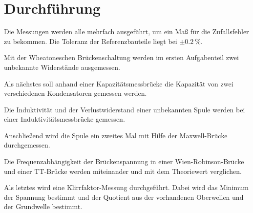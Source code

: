 \section{Durchführung}
\label{sec:Durchführung}

Die Messungen werden alle mehrfach ausgeführt, um ein Maß für die Zufallsfehler zu bekommen. Die Toleranz der Referenzbauteile liegt bei $\pm \SI{0.2}{\percent}$.

Mit der Wheatoneschen Brückenschaltung werden im ersten Aufgabenteil zwei unbekannte Widerstände ausgemessen. 

Als nächstes soll anhand einer Kapazitätsmessbrücke die Kapazität von zwei verschiedenen Kondensatoren gemessen werden. 

Die Induktivität und der Verlustwiderstand einer unbekannten Spule werden bei einer Induktivitätsmessbrücke gemessen. 

Anschließend wird die Spule ein zweites Mal mit Hilfe der Maxwell-Brücke durchgemessen. 

Die Frequenzabhängigkeit der Brückenspannung in einer Wien-Robinson-Brücke und einer TT-Brücke werden miteinander und mit dem Theoriewert verglichen. 

Als letztes wird eine Klirrfaktor-Messung durchgeführt. Dabei wird das Minimum der Spannung bestimmt und der Quotient aus der vorhandenen Oberwellen und der Grundwelle bestimmt. 
